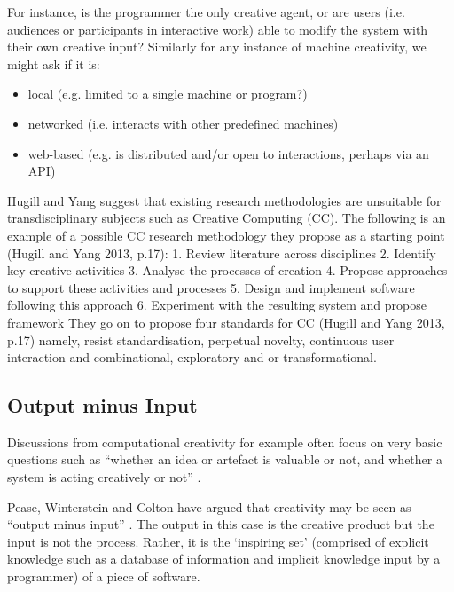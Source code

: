 For instance, is the programmer the only creative agent, or are users (i.e. audiences or participants in interactive work) able to modify the system with their own creative input? Similarly for any instance of machine creativity, we might ask if it is:

\begin{itemize}
  \item local (e.g. limited to a single machine or program?)
  \item networked (i.e. interacts with other predefined machines)
  \item web-based (e.g. is distributed and/or open to interactions, perhaps via an API)
\end{itemize}



\begin{draft}
  Hugill and Yang suggest that existing research methodologies are unsuitable for transdisciplinary subjects such as Creative Computing (CC). The following is an example of a possible CC research methodology they propose as a starting point (Hugill and Yang 2013, p.17):
  1. Review literature across disciplines
  2. Identify key creative activities
  3. Analyse the processes of creation
  4. Propose approaches to support these activities and processes 5. Design and implement software following this approach
  6. Experiment with the resulting system and propose framework
  They go on to propose four standards for CC (Hugill and Yang 2013, p.17) namely, resist standardisation, perpetual novelty, continuous user interaction and combinational, exploratory and or transformational.
\end{draft}


\subsection{Output minus Input}

Discussions from computational creativity for example often focus on very basic questions such as ``whether an idea or artefact is valuable or not, and whether a system is acting creatively or not'' \autocite{Pease2011}.

Pease, Winterstein and Colton have argued that creativity may be seen as ``output minus input'' \autocite[p.2]{Pease2001}. The output in this case is the creative product but the input is not the process. Rather, it is the `inspiring set' (comprised of explicit knowledge such as a database of information and implicit knowledge input by a programmer) of a piece of software.

